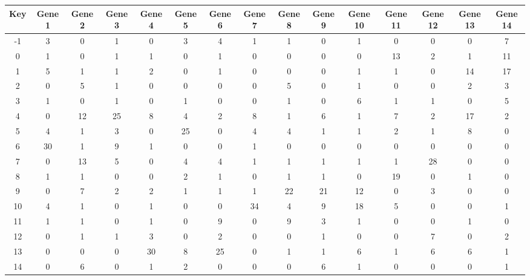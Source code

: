 \begin{tabular}{|c|c|c|c|c|c|c|c|c|c|c|c|c|c|c|}
\hline
Key & Gene 1 & Gene 2 & Gene 3 & Gene 4 & Gene 5 & Gene 6 & Gene 7 & Gene 8 & Gene 9 & Gene 10 & Gene 11 & Gene 12 & Gene 13 & Gene 14 \\
\hline
-1 & 3 & 0 & 1 & 0 & 3 & 4 & 1 & 1 & 0 & 1 & 0 & 0 & 0 & 7 \\
0 & 1 & 0 & 1 & 1 & 0 & 1 & 0 & 0 & 0 & 0 & 13 & 2 & 1 & 11 \\
1 & 5 & 1 & 1 & 2 & 0 & 1 & 0 & 0 & 0 & 1 & 1 & 0 & 14 & 17 \\
2 & 0 & 5 & 1 & 0 & 0 & 0 & 0 & 5 & 0 & 1 & 0 & 0 & 2 & 3 \\
3 & 1 & 0 & 1 & 0 & 1 & 0 & 0 & 1 & 0 & 6 & 1 & 1 & 0 & 5 \\
4 & 0 & 12 & 25 & 8 & 4 & 2 & 8 & 1 & 6 & 1 & 7 & 2 & 17 & 2 \\
5 & 4 & 1 & 3 & 0 & 25 & 0 & 4 & 4 & 1 & 1 & 2 & 1 & 8 & 0 \\
6 & 30 & 1 & 9 & 1 & 0 & 0 & 1 & 0 & 0 & 0 & 0 & 0 & 0 & 0 \\
7 & 0 & 13 & 5 & 0 & 4 & 4 & 1 & 1 & 1 & 1 & 1 & 28 & 0 & 0 \\
8 & 1 & 1 & 0 & 0 & 2 & 1 & 0 & 1 & 1 & 0 & 19 & 0 & 1 & 0 \\
9 & 0 & 7 & 2 & 2 & 1 & 1 & 1 & 22 & 21 & 12 & 0 & 3 & 0 & 0 \\
10 & 4 & 1 & 0 & 1 & 0 & 0 & 34 & 4 & 9 & 18 & 5 & 0 & 0 & 1 \\
11 & 1 & 1 & 0 & 1 & 0 & 9 & 0 & 9 & 3 & 1 & 0 & 0 & 1 & 0 \\
12 & 0 & 1 & 1 & 3 & 0 & 2 & 0 & 0 & 1 & 0 & 0 & 7 & 0 & 2 \\
13 & 0 & 0 & 0 & 30 & 8 & 25 & 0 & 1 & 1 & 6 & 1 & 6 & 6 & 1 \\
14 & 0 & 6 & 0 & 1 & 2 & 0 & 0 & 0 & 6 & 1 & 0 & 0 & 0 & 1 \\
\hline
\end{tabular}